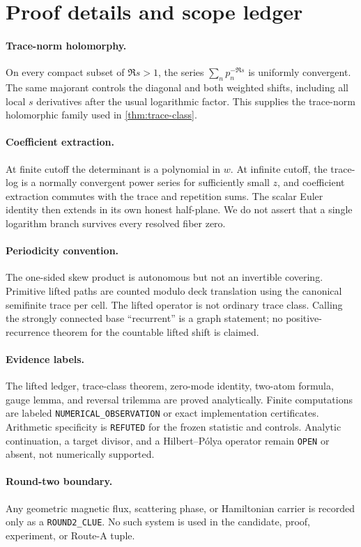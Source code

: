 \section{Proof details and scope ledger}

\paragraph{Trace-norm holomorphy.}
On every compact subset of $\Re s>1$, the series
$\sum_np_n^{-\Re s}$ is uniformly convergent.  The same majorant controls the
diagonal and both weighted shifts, including all local $s$ derivatives after
the usual logarithmic factor.  This supplies the trace-norm holomorphic family
used in \cref{thm:trace-class}.

\paragraph{Coefficient extraction.}
At finite cutoff the determinant is a polynomial in $w$.  At infinite cutoff,
the trace-log is a normally convergent power series for sufficiently small
$z$, and coefficient extraction commutes with the trace and repetition sums.
The scalar Euler identity then extends in its own honest half-plane.  We do
not assert that a single logarithm branch survives every resolved fiber zero.

\paragraph{Periodicity convention.}
The one-sided skew product is autonomous but not an invertible covering.
Primitive lifted paths are counted modulo deck translation using the canonical
semifinite trace per cell.  The lifted operator is not ordinary trace class.
Calling the strongly connected base ``recurrent'' is a graph
statement; no positive-recurrence theorem for the countable lifted shift is
claimed.

\paragraph{Evidence labels.}
The lifted ledger, trace-class theorem, zero-mode identity, two-atom formula,
gauge lemma, and reversal trilemma are proved analytically.  Finite
computations are labeled \texttt{NUMERICAL\_OBSERVATION} or exact
implementation certificates.  Arithmetic specificity is
\texttt{REFUTED} for the frozen statistic and controls.  Analytic
continuation, a target divisor, and a Hilbert--P\'olya operator remain
\texttt{OPEN} or absent, not numerically supported.

\paragraph{Round-two boundary.}
Any geometric magnetic flux, scattering phase, or Hamiltonian carrier is
recorded only as a \texttt{ROUND2\_CLUE}.  No such system is used in the
candidate, proof, experiment, or Route-A tuple.
